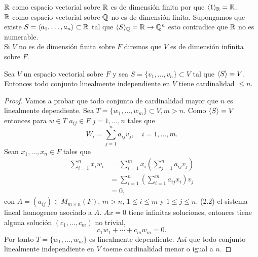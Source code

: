 \documentclass[12pt,a4paper]{book}
\newcommand{\parentesis}[1]{\left(#1\right)}
\begin{document}
    \begin{ejemplo}
        $\mathbb{R}$ como espacio vectorial sobre $\mathbb{R}$ es de dimensión finita por que $\langle 1 \rangle_{\mathbb{R}}=\mathbb{R}$.\\
        $\mathbb{R}$ como espacio vectorial sobre $\mathbb{Q}$ no es de dimensión finita. Supongamos que existe
        $S=\langle a_{1},\dots,a_{n} \rangle\subset\mathbb{R}$ tal que $\langle S \rangle_{\mathbb{Q}}=\mathbb{R}\to\mathbb{Q}^{n}$ esto contradice
        que $\mathbb{R}$ no es numerable.\\
        Si $V$ no es de dimensión finita sobre $F$ diremos que $V$ es de dimensión infinita sobre
        $F$.
    \end{ejemplo}

    \begin{teorema}
        Sea $V$ un espacio vectorial sobre $F$ y sea $S=\{v_{1},\dots,v_{n}\}\subset V$ tal que
        $\langle S \rangle=V$. Entonces todo conjunto linealmente independiente en $V$ tiene cardinalidad
        $\leq n$.
    \end{teorema}
    
    \begin{proof}
        Vamos a probar que todo conjunto de cardinalidad mayor que $n$ es linealmente dependiente.
        Sea $T=\{w_{1},\dots,w_{m}\}\subset V, m\gt n$. Como $\langle S \rangle=V$ entonces para $w\in T$
        $a_{ij}\in F$ $j=1,\dots,n$ tales que
        \begin{equation*}
            W_{i}=\sum_{j=1}^{n}a_{ij}v_{j},\quad i=1,\dots,m.
        \end{equation*}
        Sean $x_{1},\dots,x_{n}\in F$ tales que
        \begin{align}
            \sum_{i=1}^{n}x_{i}w_{i}&=\sum_{i=1}^{m}x_{i}\parentesis{\sum_{j=1}^{n}a_{ij}v_{j}}\\
            &=\sum_{i=1}^{n}\parentesis{\sum_{i=1}^{m}a_{ij}x_{i}}v_{j}\\
            &=0,
        \end{align}
        con $A=(a_{ij})\in M_{m\times n}(F)$, $m\gt n$, $1\leq i\leq m$ y $1\leq j\leq n$.
        (2.2) el sistema lineal homogeneo asociado a $A$. $Ax=0$ tiene infinitas soluciones,
        entonces tiene alguna solución $(c_{1},\dots,c_{m})$ no trivial,
        \begin{equation*}
            c_{1}w_{1}+\cdots+c_{m}w_{m}=0.
        \end{equation*}
        Por tanto $T=\{w_{1},\dots,w_{m}\}$ es linealmente dependiente. Así que todo conjunto
        linealmente independiente en $V$ toeme cardinalidad menor o igual a $n$.
    \end{proof}
\end{document}
